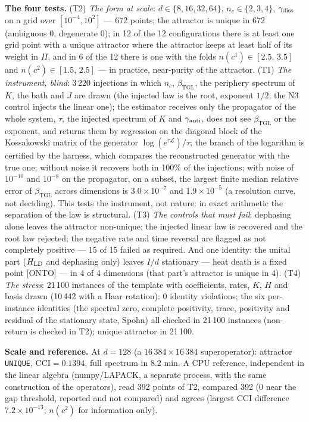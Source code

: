 \documentclass[11pt]{article}
\newcommand{\bTGL}{\beta_{\mathrm{TGL}}}\newcommand{\Msun}{M_{\odot}}\newcommand{\TGL}{\mathrm{TGL}}
\theoremstyle{definition}\newtheorem{deriv}{Derivation}
\begin{document}
\textbf{The four tests.} (T2) \emph{The form at scale}: $d\in\{8,16,32,64\}$, $n_c\in\{2,3,4\}$, $\gamma_{\rm diss}$ on a grid over $[10^{-4},10^{2}]$ --- 672 points; the attractor is unique in 672 (ambiguous 0, degenerate 0); in 12 of the 12 configurations there is at least one grid point with a unique attractor where the attractor keeps at least half of its weight in $\Pi$, and in 6 of the 12 there is one with the folds $n(c^1)\in[2.5,\,3.5]$ and $n(c^2)\in[1.5,\,2.5]$ --- in practice, near-purity of the attractor. (T1) \emph{The instrument, blind}: 3\,220 injections in which $n_c$, $\bTGL$, the periphery spectrum of $K$, the bath and $J$ are drawn (the injected law is the root, exponent $1/2$; the N3 control injects the linear one); the estimator receives only the propagator of the whole system, $\tau$, the injected spectrum of $K$ and $\gamma_{\rm anti}$, does not see $\bTGL$ or the exponent, and returns them by regression on the diagonal block of the Kossakowski matrix of the generator $\log(e^{\tau\mathcal L})/\tau$; the branch of the logarithm is certified by the harness, which compares the reconstructed generator with the true one; without noise it recovers both in 100\% of the injections; with noise of $10^{-10}$ and $10^{-8}$ on the propagator, on a subset, the largest finite median relative error of $\bTGL$ across dimensions is $3.0\times10^{-7}$ and $1.9\times10^{-5}$ (a resolution curve, not deciding). This tests the instrument, not nature: in exact arithmetic the separation of the law is structural. (T3) \emph{The controls that must fail}: dephasing alone leaves the attractor non-unique; the injected linear law is recovered and the root law rejected; the negative rate and time reversal are flagged as not completely positive --- 15 of 15 failed as required. And one identity: the unital part ($H_{\rm LD}$ and dephasing only) leaves $I/d$ stationary --- heat death is a fixed point \textsf{[ONTO]} --- in 4 of 4 dimensions (that part's attractor is unique in 4). (T4) \emph{The stress}: 21\,100 instances of the template with coefficients, rates, $K$, $H$ and basis drawn (10\,442 with a Haar rotation): 0 identity violations; the six per-instance identities (the spectral zero, complete positivity, trace, positivity and residual of the stationary state, Spohn) all checked in 21\,100 instances (non-return is checked in T2); unique attractor in 21\,100.

\textbf{Scale and reference.} At $d=128$ (a $16\,384\times16\,384$ superoperator): attractor \texttt{UNIQUE}, $\mathrm{CCI}=0.1394$, full spectrum in 8.2 min. A CPU reference, independent in the linear algebra (numpy/LAPACK, a separate process, with the same construction of the operators), read 392 points of T2, compared 392 (0 near the gap threshold, reported and not compared) and agrees (largest CCI difference $7.2\times10^{-13}$; $n(c^2)$ for information only).
\end{document}
